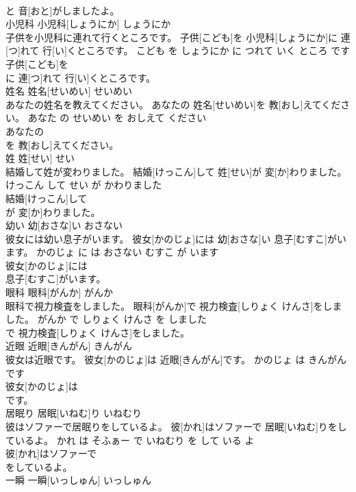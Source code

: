 \documentclass[8pt]{extreport}
\begin{document}
\begin{CJK}{UTF8}{min}
\\	と 音[おと]がしましたよ。			
\\	小児科	小児科[しょうにか]	しょうにか	
\\	子供を小児科に連れて行くところです。	子供[こども]を 小児科[しょうにか]に 連[つ]れて 行[い]くところです。	こども を しょうにか に つれて いく ところ です	
\\	子供[こども]を
\\	に 連[つ]れて 行[い]くところです。			
\\	姓名	姓名[せいめい]	せいめい	
\\	あなたの姓名を教えてください。	あなたの 姓名[せいめい]を 教[おし]えてください。	あなた の せいめい を おしえて ください	
\\	あなたの
\\	を 教[おし]えてください。			
\\	姓	姓[せい]	せい	
\\	結婚して姓が変わりました。	結婚[けっこん]して 姓[せい]が 変[か]わりました。	けっこん して せい が かわりました	
\\	結婚[けっこん]して
\\	が 変[か]わりました。			
\\	幼い	幼[おさな]い	おさない	
\\	彼女には幼い息子がいます。	彼女[かのじょ]には 幼[おさな]い 息子[むすこ]がいます。	かのじょ に は おさない むすこ が います	
\\	彼女[かのじょ]には
\\	息子[むすこ]がいます。			
\\	眼科	眼科[がんか]	がんか	
\\	眼科で視力検査をしました。	眼科[がんか]で 視力検査[しりょく けんさ]をしました。	がんか で しりょく けんさ を しました	
\\	で 視力検査[しりょく けんさ]をしました。			
\\	近眼	近眼[きんがん]	きんがん	
\\	彼女は近眼です。	彼女[かのじょ]は 近眼[きんがん]です。	かのじょ は きんがん です	
\\	彼女[かのじょ]は
\\	です。			
\\	居眠り	居眠[いねむ]り	いねむり	
\\	彼はソファーで居眠りをしているよ。	彼[かれ]はソファーで 居眠[いねむ]りをしているよ。	かれ は そふぁー で いねむり を して いる よ	
\\	彼[かれ]はソファーで
\\	をしているよ。			
\\	一瞬	一瞬[いっしゅん]	いっしゅん	

\end{CJK}
\end{document}
